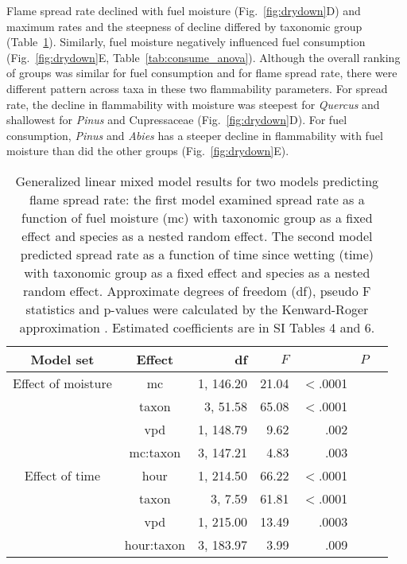 \documentclass[letterpaper,12pt]{article}
\begin{document}
Flame spread rate declined with fuel moisture (Fig.~\ref{fig:drydown}D) and
maximum rates and the steepness of decline differed by taxonomic group
(Table~\ref{tab:spreadrate_anova}). Similarly, fuel moisture negatively
influenced fuel consumption (Fig.~\ref{fig:drydown}E,
Table~\ref{tab:consume_anova}). Although the overall ranking of groups was
similar for fuel consumption and for flame spread rate, there were different
pattern across taxa in these two flammability parameters. For spread rate, the
decline in flammability with moisture was steepest for \emph{Quercus} and
shallowest for \emph{Pinus} and Cupressaceae (Fig.~\ref{fig:drydown}D). For
fuel consumption, \emph{Pinus} and \emph{Abies} has a steeper decline in
flammability with fuel moisture than did the other groups
(Fig.~\ref{fig:drydown}E).

\begin{table}
  \caption{Generalized linear mixed model results for two models predicting
    flame spread rate: the first model examined spread rate as a function of
    fuel moisture (mc) with taxonomic group as a fixed effect and species as a
    nested random effect. The second model predicted spread rate as a function
    of time since wetting (time) with taxonomic group as a fixed effect and
    species as a nested random effect. Approximate degrees of freedom (df),
    pseudo F statistics and p-values were calculated by the Kenward-Roger
    approximation \citep{Kenward_Roger-1997}. Estimated coefficients are in SI
    Tables 4 and 6.}
  \label{tab:spreadrate_anova}
  
\centering
\begin{tabular}{ccrrrrr}
  \toprule
Model set & Effect & df & $F$ & & $P$ \\
  \midrule
  Effect of moisture & mc & 1, 146.20 & 21.04 & $<$.0001 \\ 
 & taxon & 3, 51.58 & 65.08 & $<$.0001 \\ 
 & vpd & 1, 148.79 & 9.62 & .002 \\ 
 & mc:taxon & 3, 147.21 & 4.83 & .003 \\ 
   
  \midrule
  
  Effect of time & hour & 1, 214.50 & 66.22 & $<$.0001 \\ 
 &  taxon & 3, 7.59 & 61.81 & $<$.0001 \\ 
 & vpd & 1, 215.00 & 13.49 & .0003 \\ 
 & hour:taxon & 3, 183.97 & 3.99 & .009 \\ 

   \bottomrule

\end{tabular}
\end{table}
\end{document}
